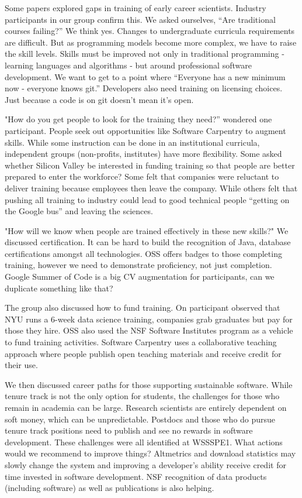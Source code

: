\documentclass[11pt, oneside]{amsart}
\begin{document}
Some papers explored gaps in training of early career scientists. Industry
participants in our group confirm this. We asked ourselves, ``Are
traditional courses failing?'' We think yes. Changes to undergraduate
curricula requirements are difficult. But as programming models become
more complex, we have to raise the skill levels. Skills must be improved
not only in traditional programming - learning languages and algorithms -
but around professional software development. We want to get to a point
where ``Everyone has a new minimum now - everyone knows git.'' Developers
also need training on licensing choices. Just because a code is on git
doesn't mean it's open.

"How do you get people to look for the training they need?'' wondered one
participant. People seek out opportunities like Software Carpentry to
augment skills. While some instruction can be done in an institutional
curricula, independent groups (non-profits, institutes) have more
flexibility. Some asked whether Silicon Valley be interested in funding
training so that people are better prepared to enter the workforce? Some
felt that companies were reluctant to deliver training because employees
then leave the company. While others felt that pushing all training to
industry could lead to good technical people ``getting on the Google bus''
and leaving the sciences.

"How will we know when people are trained effectively in these new
skills?" We discussed certification. It can be hard to build the
recognition of Java, database certifications amongst all technologies. OSS
offers badges to those completing training, however we need to demonstrate
proficiency, not just completion. Google Summer of Code is a big CV
augmentation for participants, can we duplicate something like that?

The group also discussed how to fund training. On participant observed
that NYU runs a 6-week data science training, companies grab graduates but
pay for those they hire. OSS also used the NSF Software Institutes program
as a vehicle to fund training activities. Software Carpentry uses a
collaborative teaching approach where  people publish open teaching
materials and receive credit for their use.


We then discussed career paths for those supporting sustainable software.
While tenure track is not the only option for students, the challenges for
those who remain in academia can be large. Research scientists are
entirely dependent on soft money, which can be unpredictable. Postdocs and
those who do pursue tenure track positions need to publish and see no
rewards in software development. These challenges were all identified at
WSSSPE1. What actions would we recommend to improve things? Altmetrics and
download statistics may slowly change the system and improving a
developer's ability receive credit for time invested in software
development. NSF recognition of data products (including software) as well
as publications is also helping.
\end{document}
